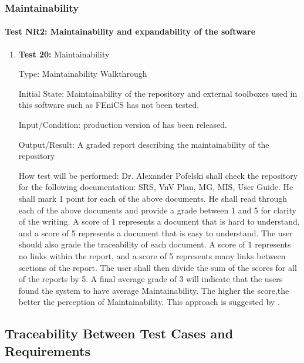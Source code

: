 \documentclass[12pt, titlepage]{article}
\begin{document}
\subsubsection{Maintainability}

\paragraph{Test NR2: Maintainability and expandability of the software}

\begin{enumerate}
	
	\item{\textbf{Test 20:} Maintainability\\}
	
	Type: Maintainability Walkthrough
	
	Initial State: Maintainability of the repository and external toolboxes used in this software such as FEniCS has not been tested.
	
	Input/Condition: production version of \progname{} has been released.
	
	Output/Result: A graded report describing the maintainability of the repository
	
	How test will be performed: Dr. Alexander Pofelski shall check the repository for the following documentation:  SRS, VnV Plan, MG, MIS, User Guide. He shall mark 1 point for each of the above documents. He shall read through each of the above documents and
	provide a grade between 1 and 5 for clarity of the writing. A score of 1 represents a document that is hard to understand, and a score of 5 represents a document that is easy to understand. The user should also grade the traceability of each document. A score of 1 represents no links within the report, and a score of 5 represents many links between sections of the report. The user shall then divide the sum of the scores for all of the reports by 5.
	 A final average grade of 3 will indicate that the users found the system to have average Maintainability. The higher the score,the better the perception of Maintainability. This approach is suggested by \cite{LatticeB41:online}. 
					
\end{enumerate}

\subsection{Traceability Between Test Cases and Requirements}
\end{document}
